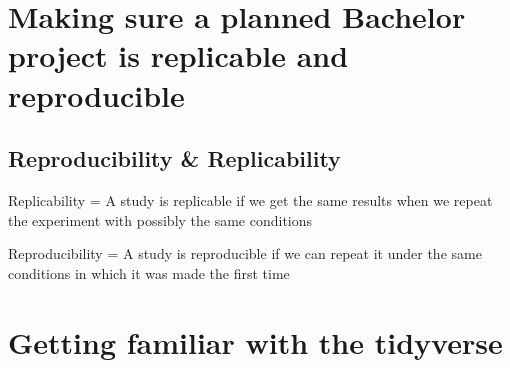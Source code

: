 \documentclass[11pt]{article}
\begin{document}
\section{Making sure a planned Bachelor project is replicable and reproducible}
\label{sec:org151616e}
\subsection{Reproducibility \& Replicability}
\label{sec:orgcb82f6c}
Replicability = A study is replicable if we get the same results
when we repeat the experiment with possibly the same conditions

Reproducibility =  A study is reproducible if we can repeat it under the same conditions
in which it was made the first time

\section{Getting familiar with the tidyverse}
\label{sec:org4952009}
\end{document}
